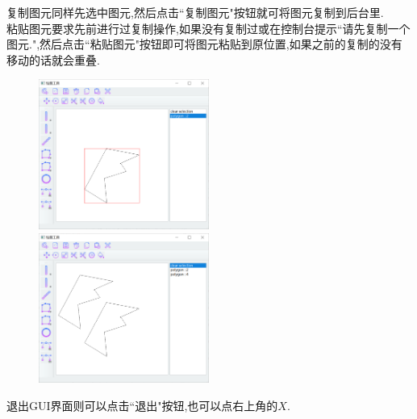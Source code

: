 \documentclass[a4paper,UTF8]{article}
\theoremstyle{definition}
\begin{document}
\indent 复制图元同样先选中图元,然后点击``复制图元"按钮就可将图元复制到后台里.\\
\indent 粘贴图元要求先前进行过复制操作,如果没有复制过或在控制台提示``请先复制一个图元.",然后点击``粘贴图元"按钮即可将图元粘贴到原位置,如果之前的复制的没有移动的话就会重叠.\\
\begin{figure}[H]
	\centering
	\begin{minipage}[t]{0.5\linewidth}
		\includegraphics[width=2.2in]{paste1.png}
	\end{minipage}%
	\begin{minipage}[t]{0.5\linewidth}
		\includegraphics[width=2.2in]{paste2.png}
	\end{minipage}
\end{figure}
\indent 退出GUI界面则可以点击``退出"按钮,也可以点右上角的$X$.
\end{document}
